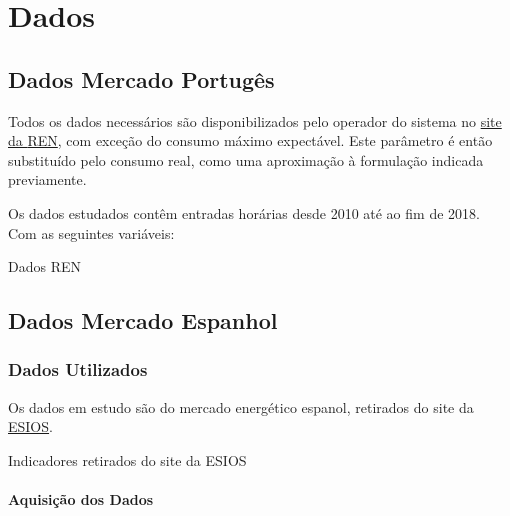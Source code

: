 
\section{Dados}

\subsection{Dados Mercado Portugês\label{se:dados_pt}}

Todos os dados necessários são disponibilizados pelo operador do sistema no \href{https://mercado.ren.pt/PT/Electr}{site da \gls{REN}}, com exceção do consumo máximo expectável. Este parâmetro é então substituído pelo consumo real, como uma aproximação à formulação indicada previamente.\par
Os dados estudados contêm entradas horárias desde 2010 até ao fim de 2018. Com as seguintes variáveis:\\

\begin{table}[H] \centering \caption{Dados REN}  \end{table}



\subsection{Dados Mercado Espanhol\label{se:dados_es}}


\subsubsection{Dados Utilizados\label{se:dadosestudo}}

Os dados em estudo são do mercado energético espanol, retirados do site da \href{https://www.esios.ree.es/es}{\gls{ESIOS}}.


\begin{table}[H]
    \caption{Indicadores retirados do site da ESIOS}    
\end{table}


\paragraph{Aquisição dos Dados}
\text{ }  \par

